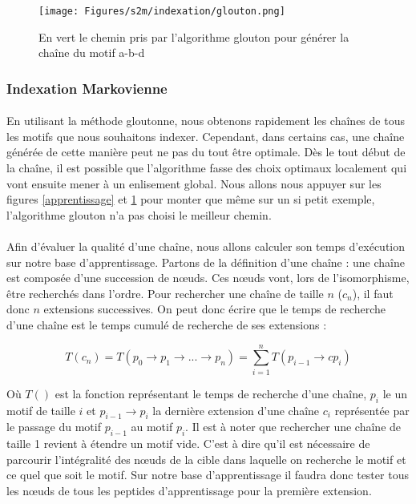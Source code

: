 \documentclass[12pt,french,twoside]{report}
\begin{document}
\begin{figure}
  \texttt{[image: Figures/s2m/indexation/glouton.png]}
  \caption{\label{glouton}En vert le chemin pris par l'algorithme glouton pour générer la chaîne du motif a-b-d}
\end{figure}

\subsubsection{Indexation Markovienne}

\label{index_markov}

\paragraph{}En utilisant la méthode gloutonne, nous obtenons rapidement les chaînes de tous les motifs que nous
souhaitons indexer. Cependant, dans certains cas, une chaîne générée de cette manière peut ne pas du tout être optimale.
Dès le tout début de la chaîne, il est possible que l'algorithme fasse des choix optimaux localement qui vont ensuite mener à un
enlisement global. Nous allons nous appuyer sur les figures \ref{apprentissage} et \ref{glouton} pour monter que même sur un si
petit exemple, l'algorithme glouton n'a pas choisi le meilleur chemin.

\paragraph{}Afin d'évaluer la qualité d'une chaîne, nous allons calculer son temps d'exécution sur notre base d'apprentissage.
Partons de la définition d'une chaîne : une chaîne est composée d'une succession de n\oe{}uds. Ces n\oe{}uds vont, lors de l'isomorphisme,
être recherchés dans l'ordre. Pour rechercher une chaîne de taille $n$ ($c_n$), il faut donc $n$ extensions successives. On
peut donc écrire que le temps de recherche d'une chaîne est le temps cumulé de recherche de ses extensions :

\begin{equation}
 T(c_n) = T(p_0 \rightarrow p_1 \rightarrow ... \rightarrow p_n) = \sum_{i=1}^n T(p_{i-1} \rightarrow cp_i)
\end{equation}

Où $T()$ est la fonction représentant le temps de recherche d'une chaîne, $p_i$ le un motif de taille $i$ et $p_{i-1} \rightarrow
p_i$ la dernière extension d'une chaîne $c_i$ représentée par le passage du motif $p_{i-1}$ au motif $p_i$. Il est à noter que
rechercher une chaîne de taille 1 revient à étendre un motif vide. C'est à dire qu'il est nécessaire de parcourir l'intégralité
des n\oe{}uds de la cible dans laquelle on recherche le motif et ce quel que soit le motif. Sur notre base d'apprentissage il faudra
donc tester tous les n\oe{}uds de tous les peptides d'apprentissage pour la première extension.
\end{document}
